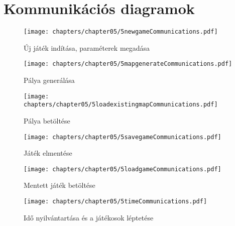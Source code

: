 \section{Kommunikációs diagramok}


\begin{figure}[h]
	\begin{center}
		\texttt{[image: chapters/chapter05/5newgameCommunications.pdf]}
		\caption{Új játék indítása, paraméterek megadása}
		\label{fig:5newgameCommunication}
	\end{center}
\end{figure}

\begin{figure}[h]
	\begin{center}
		\texttt{[image: chapters/chapter05/5mapgenerateCommunications.pdf]}
		\caption{Pálya generálása}
		\label{fig:5mapgenerateCommunication}
	\end{center}
\end{figure}

\begin{figure}[h]
	\begin{center}
		\texttt{[image: chapters/chapter05/5loadexistingmapCommunications.pdf]}
		\caption{Pálya betöltése}
		\label{fig:5loadexistingmapCommunication}
	\end{center}
\end{figure}

\begin{figure}[h]
	\begin{center}
		\texttt{[image: chapters/chapter05/5savegameCommunications.pdf]}
		\caption{Játék elmentése}
		\label{fig:5savegameCommunication}
	\end{center}
\end{figure}



\begin{figure}[h]
	\begin{center}
		\texttt{[image: chapters/chapter05/5loadgameCommunications.pdf]}
		\caption{Mentett játék betöltése}
		\label{fig:5loadgameCommunication}
	\end{center}
\end{figure}

\begin{figure}[h]
	\begin{center}
		\texttt{[image: chapters/chapter05/5timeCommunications.pdf]}
		\caption{Idő nyilvántartása és a játékosok léptetése}
		\label{fig:5timeCommunication}
	\end{center}
\end{figure}

